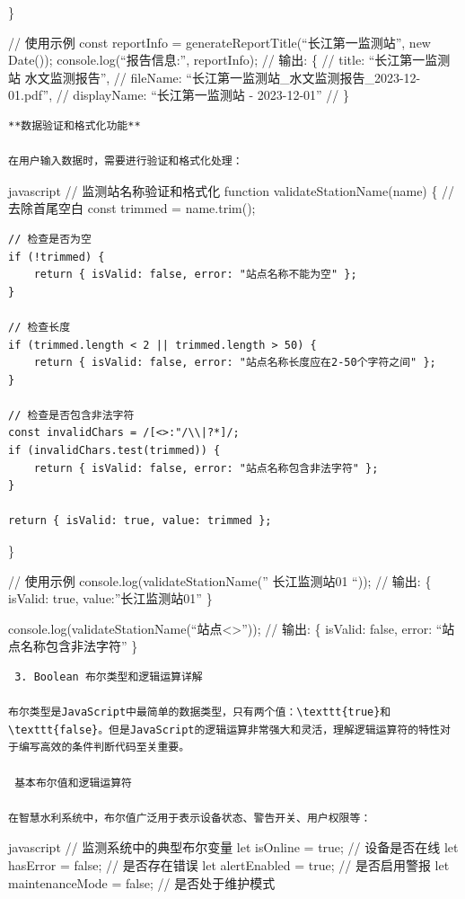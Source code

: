 \}

// 使用示例 const reportInfo = generateReportTitle(``长江第一监测站'', new Date()); console.log(``报告信息:'', reportInfo); // 输出: \{ // title: ``长江第一监测站 水文监测报告'', // fileName: ``长江第一监测站\_水文监测报告\_2023-12-01.pdf'', // displayName: ``长江第一监测站 - 2023-12-01'' // \}

\begin{lstlisting}
**数据验证和格式化功能**

在用户输入数据时，需要进行验证和格式化处理：
\end{lstlisting}

javascript // 监测站名称验证和格式化 function validateStationName(name) \{ // 去除首尾空白 const trimmed = name.trim();

\begin{verbatim}
// 检查是否为空
if (!trimmed) {
    return { isValid: false, error: "站点名称不能为空" };
}

// 检查长度
if (trimmed.length < 2 || trimmed.length > 50) {
    return { isValid: false, error: "站点名称长度应在2-50个字符之间" };
}

// 检查是否包含非法字符
const invalidChars = /[<>:"/\\|?*]/;
if (invalidChars.test(trimmed)) {
    return { isValid: false, error: "站点名称包含非法字符" };
}

return { isValid: true, value: trimmed };
\end{verbatim}

\}

// 使用示例 console.log(validateStationName('' 长江监测站01 ``)); // 输出: \{ isValid: true, value:''长江监测站01'' \}

console.log(validateStationName(``站点\textless\textgreater{}'')); // 输出: \{ isValid: false, error: ``站点名称包含非法字符'' \}

\begin{lstlisting}
 3. Boolean 布尔类型和逻辑运算详解

布尔类型是JavaScript中最简单的数据类型，只有两个值：\texttt{true}和\texttt{false}。但是JavaScript的逻辑运算非常强大和灵活，理解逻辑运算符的特性对于编写高效的条件判断代码至关重要。

 基本布尔值和逻辑运算符

在智慧水利系统中，布尔值广泛用于表示设备状态、警告开关、用户权限等：
\end{lstlisting}

javascript // 监测系统中的典型布尔变量 let isOnline = true; // 设备是否在线 let hasError = false; // 是否存在错误 let alertEnabled = true; // 是否启用警报 let maintenanceMode = false; // 是否处于维护模式

